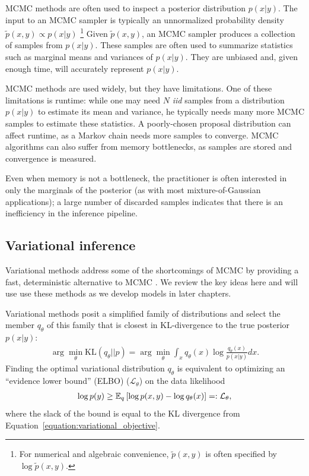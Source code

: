 MCMC methods are often used to inspect a posterior distribution $p(x |
y)$.  The input to an MCMC sampler is typically an unnormalized
probability density $\tilde p(x, y) \propto p(x | y)$ \footnote{For
  numerical and algebraic convenience, $\tilde p(x, y)$ is often
  specified by $\log \tilde p(x, y)$.}  Given $\tilde p(x, y)$, an
MCMC sampler produces a collection of samples from $p(x | y)$.  These
samples are often used to summarize statistics such as marginal means
and variances of $p(x | y)$.  They are unbiased and, given enough
time, will accurately represent $p(x | y)$.

MCMC methods are used widely, but they have limitations.
One of these limitations is runtime: while one may need $N$ \emph{iid}
samples from a distribution $p(x | y)$ to estimate its mean and
variance, he typically needs many more MCMC samples to estimate these
statistics.  A poorly-chosen proposal distribution can affect runtime,
as a Markov chain needs more samples to converge. MCMC algorithms can
also suffer from memory bottlenecks, as samples are stored and
convergence is measured.

Even when memory is not a bottleneck, the practitioner is often
interested in only the marginals of the posterior (as with most
mixture-of-Gaussian applications); a large number of discarded samples
indicates that there is an inefficiency in the inference pipeline.

\subsection{Variational inference}
\label{section:variational_inference}

Variational methods address some of the shortcomings of MCMC by
providing a fast, deterministic alternative to MCMC
\cite{jordan:2003,jordan:1999}.  We review the key ideas here and will
use use these methods as we develop models in later chapters.

Variational methods posit a simplified family of
distributions and select the member $q_\theta$ of this
family that is closest in KL-divergence to the true posterior $p(x |
y)$:
\begin{align}
  \arg \min_{\theta} \mbox{KL}(q_\theta || p) = \arg \min_{\theta} \int_x q_\theta(x) \log \frac{q_\theta(x)}{p(x | y)} dx.
  \label{equation:variational_objective}
\end{align}
Finding the optimal variational distribution $q_\theta$ is equivalent
to optimizing an ``evidence lower bound'' (ELBO) ($\mathcal{L}_\theta$) on
the data likelihood
\begin{eqnarray}
  \log p(y) \ge \mathbb{E}_q\left[\log p(x, y) - \log q_\theta(x)\right]
  =: \mathcal{L}_\theta,
  \label{equation:traditional_variational_objective}
\end{eqnarray}
where the slack of the bound is equal to the KL divergence from
Equation~\ref{equation:variational_objective}.

